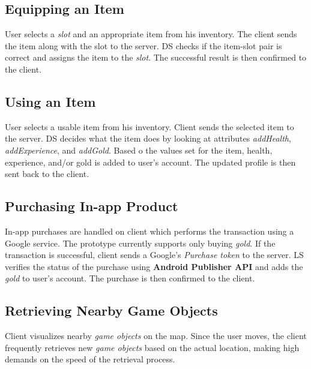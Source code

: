 	\subsection{Equipping an Item}
	User selects a \textit{slot} and an appropriate item from his inventory. The client sends the item along with the slot to the server. DS checks if the item-slot pair is correct and assigns the item to the \textit{slot}. The successful result is then confirmed to the client.
	
	\subsection{Using an Item}
	User selects a usable item from his inventory. Client sends the selected item to the server. DS decides what the item does by looking at attributes \textit{addHealth}, \textit{addExperience}, and \textit{addGold}. Based o the values set for the item, health, experience, and/or gold is added to user's account. The updated profile is then sent back to the client.
		
	\subsection{Purchasing In-app Product}
	In-app purchases are handled on client which performs the transaction using a Google service. The prototype currently supports only buying \textit{gold}. If the transaction is successful, client sends a Google's \textit{Purchase token} to the server. LS verifies the status of the purchase using \textbf{Android Publisher API} \cite{androidpublisher} and adds the \textit{gold} to user's account. The purchase is then confirmed to the client.

	\subsection{Retrieving Nearby Game Objects}
	Client visualizes nearby \textit{game objects} on the map. Since the user moves, the client frequently retrieves new \textit{game objects} based on the actual location, making high demands on the speed of the retrieval process.
	

